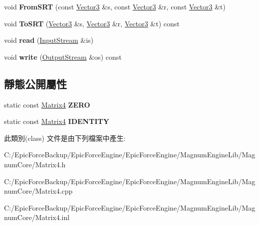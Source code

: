 \begin{DoxyCompactItemize}
\item 
void {\bfseries From\+S\+RT} (const \hyperlink{class_magnum_1_1_vector3}{Vector3} \&s, const \hyperlink{class_magnum_1_1_vector3}{Vector3} \&r, const \hyperlink{class_magnum_1_1_vector3}{Vector3} \&t)\hypertarget{class_magnum_1_1_matrix4_a87b8546e10d6885b8bb7eb373549a870}{}\label{class_magnum_1_1_matrix4_a87b8546e10d6885b8bb7eb373549a870}

\item 
void {\bfseries To\+S\+RT} (\hyperlink{class_magnum_1_1_vector3}{Vector3} \&s, \hyperlink{class_magnum_1_1_vector3}{Vector3} \&r, \hyperlink{class_magnum_1_1_vector3}{Vector3} \&t) const \hypertarget{class_magnum_1_1_matrix4_af3c33a1a568cfb1e33e39a83c02b1ac1}{}\label{class_magnum_1_1_matrix4_af3c33a1a568cfb1e33e39a83c02b1ac1}

\item 
void {\bfseries read} (\hyperlink{class_magnum_1_1_input_stream}{Input\+Stream} \&is)\hypertarget{class_magnum_1_1_matrix4_aa02a6219594ef7c2b74971de8e4443f6}{}\label{class_magnum_1_1_matrix4_aa02a6219594ef7c2b74971de8e4443f6}

\item 
void {\bfseries write} (\hyperlink{class_magnum_1_1_output_stream}{Output\+Stream} \&os) const \hypertarget{class_magnum_1_1_matrix4_ae08c1f9c8c00ea850fef62ecc57af955}{}\label{class_magnum_1_1_matrix4_ae08c1f9c8c00ea850fef62ecc57af955}

\end{DoxyCompactItemize}
\subsection*{靜態公開屬性}
\begin{DoxyCompactItemize}
\item 
static const \hyperlink{class_magnum_1_1_matrix4}{Matrix4} {\bfseries Z\+E\+RO}\hypertarget{class_magnum_1_1_matrix4_ab3067f8422c53a0d46ddd196f8eb0f1c}{}\label{class_magnum_1_1_matrix4_ab3067f8422c53a0d46ddd196f8eb0f1c}

\item 
static const \hyperlink{class_magnum_1_1_matrix4}{Matrix4} {\bfseries I\+D\+E\+N\+T\+I\+TY}\hypertarget{class_magnum_1_1_matrix4_af1a8bbab0eb73a6c499b16385ad6d75d}{}\label{class_magnum_1_1_matrix4_af1a8bbab0eb73a6c499b16385ad6d75d}

\end{DoxyCompactItemize}


此類別(class) 文件是由下列檔案中產生\+:\begin{DoxyCompactItemize}
\item 
C\+:/\+Epic\+Force\+Backup/\+Epic\+Force\+Engine/\+Epic\+Force\+Engine/\+Magnum\+Engine\+Lib/\+Magnum\+Core/Matrix4.\+h\item 
C\+:/\+Epic\+Force\+Backup/\+Epic\+Force\+Engine/\+Epic\+Force\+Engine/\+Magnum\+Engine\+Lib/\+Magnum\+Core/Matrix4.\+cpp\item 
C\+:/\+Epic\+Force\+Backup/\+Epic\+Force\+Engine/\+Epic\+Force\+Engine/\+Magnum\+Engine\+Lib/\+Magnum\+Core/Matrix4.\+inl\end{DoxyCompactItemize}
